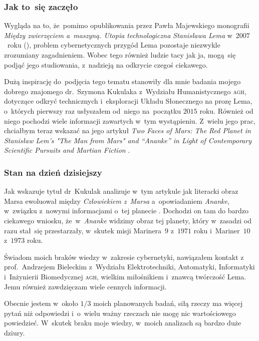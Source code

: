 \documentclass[10pt,t]{beamer}
\begin{document}
\begin{frame}
  \frametitle{Jak to~się zaczęło}


  Wygląda na to, że~pomimo opublikowania przez Pawła Majewskiego monografii
  \textit{Między zwierzęciem a~maszyną. Utopia technologiczna Stanisława
    Lema} w~$2007$~roku
  (\parencite{Majewski-Miedzy-zwierzeciem-a-maszyna-ETC-Pub-2007}), problem
  cybernetycznych przygód Lema pozostaje niezwykle zrozumiany zagadnieniem.
  Wobec tego również ludzie tacy jak ja, mogą~się podjąć jego studiowania,
  z~nadzieją na odkrycie czegoś ciekawego.

  Dużą inspirację do~podjęcia tego tematu stanowiły dla mnie badania
  mojego dobrego znajomego
  {dr.~Szymona Kukulaka} z~Wydziału Humanistycznego \textsc{agh}, dotyczące
  odkryć technicznych i~eksploracji Układu Słonecznego na prozę
  Lema, o~których pierwszy raz usłyszałem od~niego na~początku $2015$ roku.
  Również od niego pochodzi wiele informacji zawartych w~tym wystąpieniu.
  Z~wielu jego prac, chciałbym teraz wskazać na jego artykuł \textit{Two
    Faces of Mars: The Red Planet in Stanisław Lem's "The Man from Mars" and
    “Ananke” in Light of Contemporary Scientific Pursuits and Martian
    Fiction} \parencite{Kukulak-Two-Faces-of-Mars-Pub-2023}.

\end{frame}





\begin{frame}
  \frametitle{Stan na dzień dzisiejszy}


  Jak wskazuje tytuł dr~Kukulak analizuje w~tym artykule jak literacki
  obraz Marsa ewoluował między \textit{Człowiekiem z~Marsa} a~opowiadaniem
  \textit{Ananke}, w~związku z~nowymi informacjami o~tej planecie
  \parencite{Kukulak-Two-Faces-of-Mars-Pub-2023}. Dochodzi on tam do bardzo
  ciekawego wniosku, że~w~\textit{Ananke} widzimy obraz tej planety, który
  w~zasadzi od razu stał~się przestarzały, w~skutek misji Marinera~$9$
  z~$1971$ roku i~Mariner~$10$ z~$1973$ roku.

  Świadom moich braków wiedzy w~zakresie cybernetyki, nawiązałem kontakt
  z~
  {prof.~Andrzejem Bieleckim} z~Wydziału Elektrotechniki, Automatyki,
  Informatyki i~Inżynierii Biomedycznej \textsc{agh}, wielkim miłośnikiem
  i~znawcą twórczość Lema. Jemu również zawdzięczam wiele cennych
  informacji.

  Obecnie jestem w~około $1 / 3$ moich planowanych badań, siłą rzeczy
  ma więcej pytań niż odpowiedzi i~o~wielu ważny rzeczach nie mogę nic
  wartościowego powiedzieć. W~skutek braku moje wiedzy, w~moich analizach
  są bardzo duże dziury.

\end{frame}
\end{document}
